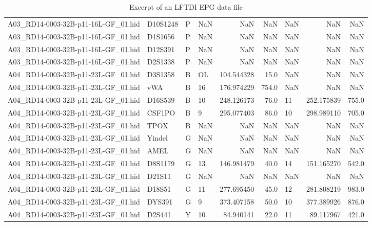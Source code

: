 \begin{landscape}
\begin{table}[htbp]
\begin{tabular}{llllrrlrr}
A03\_RD14-0003-32B-p11-16L-GF\_01.hid & D10S1248 &   P &      NaN &        NaN &       NaN &      NaN &        NaN &       NaN \\
A03\_RD14-0003-32B-p11-16L-GF\_01.hid &  D1S1656 &   P &      NaN &        NaN &       NaN &      NaN &        NaN &       NaN \\
A03\_RD14-0003-32B-p11-16L-GF\_01.hid &  D12S391 &   P &      NaN &        NaN &       NaN &      NaN &        NaN &       NaN \\
A03\_RD14-0003-32B-p11-16L-GF\_01.hid &  D2S1338 &   P &      NaN &        NaN &       NaN &      NaN &        NaN &       NaN \\
A04\_RD14-0003-32B-p11-23L-GF\_01.hid &  D3S1358 &   B &       OL & 104.544328 &      15.0 &      NaN &        NaN &       NaN \\
A04\_RD14-0003-32B-p11-23L-GF\_01.hid &      vWA &   B &       16 & 176.974229 &     754.0 &      NaN &        NaN &       NaN \\
A04\_RD14-0003-32B-p11-23L-GF\_01.hid &  D16S539 &   B &       10 & 248.126173 &      76.0 &       11 & 252.175839 &     755.0 \\
A04\_RD14-0003-32B-p11-23L-GF\_01.hid &   CSF1PO &   B &        9 & 295.077403 &      86.0 &       10 & 298.989110 &     705.0 \\
A04\_RD14-0003-32B-p11-23L-GF\_01.hid &     TPOX &   B &      NaN &        NaN &       NaN &      NaN &        NaN &       NaN \\
A04\_RD14-0003-32B-p11-23L-GF\_01.hid &   Yindel &   G &      NaN &        NaN &       NaN &      NaN &        NaN &       NaN \\
A04\_RD14-0003-32B-p11-23L-GF\_01.hid &     AMEL &   G &      NaN &        NaN &       NaN &      NaN &        NaN &       NaN \\
A04\_RD14-0003-32B-p11-23L-GF\_01.hid &  D8S1179 &   G &       13 & 146.981479 &      40.0 &       14 & 151.165270 &     542.0 \\
A04\_RD14-0003-32B-p11-23L-GF\_01.hid &   D21S11 &   G &      NaN &        NaN &       NaN &      NaN &        NaN &       NaN \\
A04\_RD14-0003-32B-p11-23L-GF\_01.hid &   D18S51 &   G &       11 & 277.695450 &      45.0 &       12 & 281.808219 &     983.0 \\
A04\_RD14-0003-32B-p11-23L-GF\_01.hid &   DYS391 &   G &        9 & 373.407158 &      50.0 &       10 & 377.389926 &     876.0 \\
A04\_RD14-0003-32B-p11-23L-GF\_01.hid &   D2S441 &   Y &       10 &  84.940141 &      22.0 &       11 &  89.117967 &     421.0 \\
\bottomrule
\end{tabular}
\caption{Excerpt of an LFTDI EPG data file}
\label{table:Excerpt of an LFTDI EPG data file}
\end{table}
\end{landscape}

